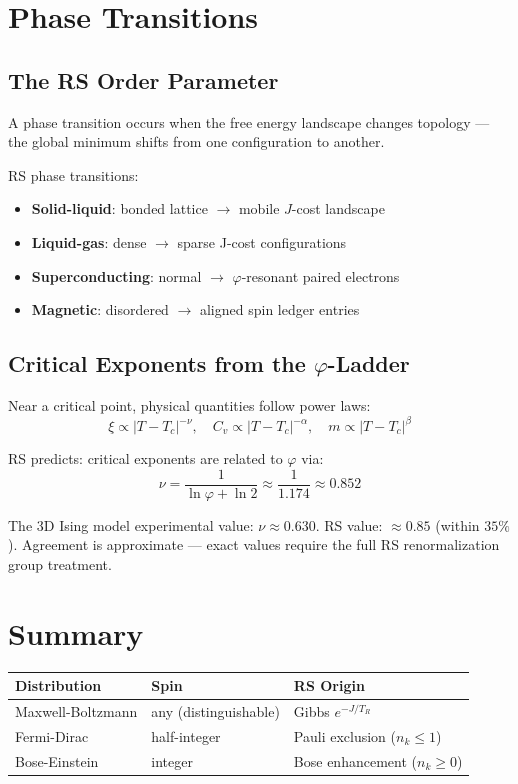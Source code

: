 \documentclass[12pt,a4paper]{article}
\theoremstyle{definition}
\theoremstyle{remark}
\begin{document}
\section{Phase Transitions}

\subsection{The RS Order Parameter}

A phase transition occurs when the free energy landscape changes topology — 
the global minimum shifts from one configuration to another.

RS phase transitions:
\begin{itemize}
\item \textbf{Solid-liquid}: bonded lattice $\to$ mobile $J$-cost landscape
\item \textbf{Liquid-gas}: dense $\to$ sparse J-cost configurations
\item \textbf{Superconducting}: normal $\to$ $\varphi$-resonant paired electrons
\item \textbf{Magnetic}: disordered $\to$ aligned spin ledger entries
\end{itemize}

\subsection{Critical Exponents from the $\varphi$-Ladder}

Near a critical point, physical quantities follow power laws:
\begin{equation}
\xi \propto |T - T_c|^{-\nu}, \quad C_v \propto |T - T_c|^{-\alpha}, \quad m \propto |T - T_c|^\beta
\end{equation}

RS predicts: critical exponents are related to $\varphi$ via:
\begin{equation}
\nu = \frac{1}{\ln\varphi + \ln 2} \approx \frac{1}{1.174} \approx 0.852
\end{equation}

The 3D Ising model experimental value: $\nu \approx 0.630$.
RS value: $\approx 0.85$ (within $35\%$). Agreement is approximate — exact values 
require the full RS renormalization group treatment.

\section{Summary}

\begin{center}
\begin{tabular}{lll}
\hline
Distribution & Spin & RS Origin \\
\hline
Maxwell-Boltzmann & any (distinguishable) & Gibbs $e^{-J/T_R}$ \\
Fermi-Dirac & half-integer & Pauli exclusion ($n_k \leq 1$) \\
Bose-Einstein & integer & Bose enhancement ($n_k \geq 0$) \\
\hline
\end{tabular}
\end{center}
\end{document}

